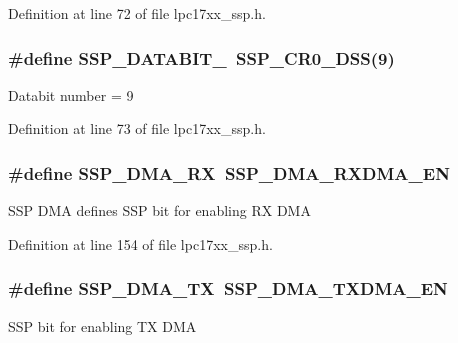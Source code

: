 \-Definition at line 72 of file lpc17xx\-\_\-ssp.\-h.

\hypertarget{group___s_s_p___public___macros_ga63076fc45604c634c7935aa8310d9a4d}{
\subsubsection[{\-S\-S\-P\-\_\-\-D\-A\-T\-A\-B\-I\-T\-\_\-9}]{\setlength{\rightskip}{0pt plus 5cm}\#define {\bf \-S\-S\-P\-\_\-\-D\-A\-T\-A\-B\-I\-T\-\_}~{\bf \-S\-S\-P\-\_\-\-C\-R0\-\_\-\-D\-S\-S}(9)}}\label{group___s_s_p___public___macros_ga63076fc45604c634c7935aa8310d9a4d}
\-Databit number = 9 

\-Definition at line 73 of file lpc17xx\-\_\-ssp.\-h.

\hypertarget{group___s_s_p___public___macros_gac294ff35d73ad16084bd157fec3bcfc6}{
\subsubsection[{\-S\-S\-P\-\_\-\-D\-M\-A\-\_\-\-R\-X}]{\setlength{\rightskip}{0pt plus 5cm}\#define {\bf \-S\-S\-P\-\_\-\-D\-M\-A\-\_\-\-R\-X}~{\bf \-S\-S\-P\-\_\-\-D\-M\-A\-\_\-\-R\-X\-D\-M\-A\-\_\-\-E\-N}}}\label{group___s_s_p___public___macros_gac294ff35d73ad16084bd157fec3bcfc6}
\-S\-S\-P \-D\-M\-A defines \-S\-S\-P bit for enabling \-R\-X \-D\-M\-A 

\-Definition at line 154 of file lpc17xx\-\_\-ssp.\-h.

\hypertarget{group___s_s_p___public___macros_ga442c2b693b567292aaa17bdba6789094}{
\subsubsection[{\-S\-S\-P\-\_\-\-D\-M\-A\-\_\-\-T\-X}]{\setlength{\rightskip}{0pt plus 5cm}\#define {\bf \-S\-S\-P\-\_\-\-D\-M\-A\-\_\-\-T\-X}~{\bf \-S\-S\-P\-\_\-\-D\-M\-A\-\_\-\-T\-X\-D\-M\-A\-\_\-\-E\-N}}}\label{group___s_s_p___public___macros_ga442c2b693b567292aaa17bdba6789094}
\-S\-S\-P bit for enabling \-T\-X \-D\-M\-A 

